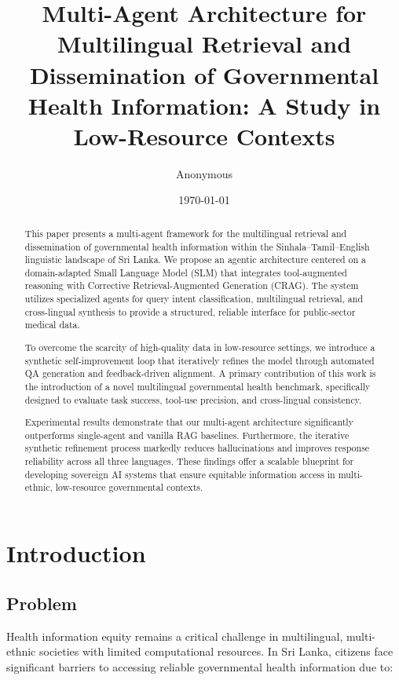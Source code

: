 \documentclass[11pt,a4paper]{article}
\title{Multi-Agent Architecture for Multilingual Retrieval and Dissemination of Governmental Health Information: A Study in Low-Resource Contexts}
\author{Anonymous}
\date{\today}
\begin{document}
\maketitle

\begin{abstract}
This paper presents a multi-agent framework for the multilingual retrieval and dissemination of governmental health information within the Sinhala--Tamil--English linguistic landscape of Sri Lanka. We propose an agentic architecture centered on a domain-adapted Small Language Model (SLM) that integrates tool-augmented reasoning with Corrective Retrieval-Augmented Generation (CRAG). The system utilizes specialized agents for query intent classification, multilingual retrieval, and cross-lingual synthesis to provide a structured, reliable interface for public-sector medical data.

To overcome the scarcity of high-quality data in low-resource settings, we introduce a synthetic self-improvement loop that iteratively refines the model through automated QA generation and feedback-driven alignment. A primary contribution of this work is the introduction of a novel multilingual governmental health benchmark, specifically designed to evaluate task success, tool-use precision, and cross-lingual consistency.

Experimental results demonstrate that our multi-agent architecture significantly outperforms single-agent and vanilla RAG baselines. Furthermore, the iterative synthetic refinement process markedly reduces hallucinations and improves response reliability across all three languages. These findings offer a scalable blueprint for developing sovereign AI systems that ensure equitable information access in multi-ethnic, low-resource governmental contexts.
\end{abstract}

\section{Introduction}

\subsection{Problem}
\label{sec:problem}

Health information equity remains a critical challenge in multilingual, multi-ethnic societies with limited computational resources. In Sri Lanka, citizens face significant barriers to accessing reliable governmental health information due to:
\end{document}
